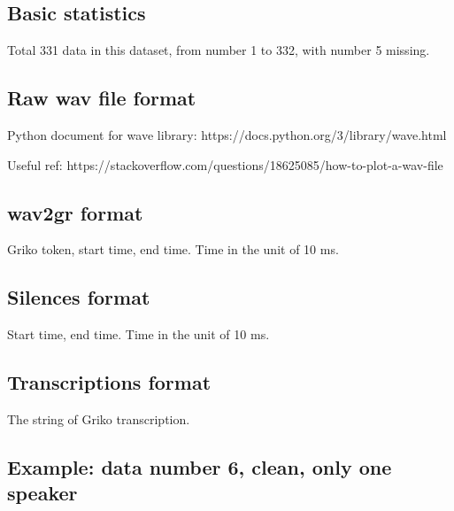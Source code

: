 \documentclass{article}
\begin{document}

\subsection{Basic statistics}

	Total 331 data in this dataset, from number 1 to 332, with number 5 missing.




\subsection{Raw wav file format}

	Python document for wave library: https://docs.python.org/3/library/wave.html

	Useful ref: https://stackoverflow.com/questions/18625085/how-to-plot-a-wav-file



\subsection{wav2gr format}

	Griko token, start time, end time. Time in the unit of 10 ms.




\subsection{Silences format}

	Start time, end time. Time in the unit of 10 ms.




\subsection{Transcriptions format}

	The string of Griko transcription.




\subsection{Example: data number 6, clean, only one speaker}
	
\end{document}
